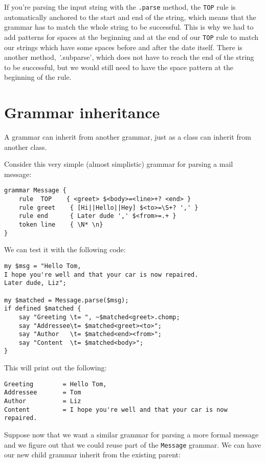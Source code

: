 If you're parsing the input string with the {\tt .parse} method,
the {\tt TOP} rule is automatically anchored to the start and end 
of the string, which means that the grammar has to match 
the whole string to be successful. This is why we had to 
add patterns for spaces at the beginning and at the end of 
our {\tt TOP} rule to match our strings which have some 
spaces before and after the date itself. There is another 
method, \emph'.subparse', which does not have to reach the 
end of the string to be successful, but we would still need to 
have the space pattern at the beginning of the rule.

\section{Grammar inheritance}

A grammar can inherit from another grammar, just as a 
class can inherit from another class.

Consider this very simple (almost simplistic) grammar 
for parsing a mail message:

\begin{verbatim}
grammar Message {
    rule  TOP    { <greet> $<body>=<line>+? <end> }
    rule greet    { [Hi||Hello||Hey] $<to>=\S+? ',' }
    rule end      { Later dude ',' $<from>=.+ }
    token line    { \N* \n}
}
\end{verbatim}

We can test it with the following code:

\begin{verbatim}
my $msg = "Hello Tom,
I hope you're well and that your car is now repaired.
Later dude, Liz";

my $matched = Message.parse($msg);
if defined $matched { 
    say "Greeting \t= ", ~$matched<greet>.chomp;
    say "Addressee\t= $matched<greet><to>";
    say "Author   \t= $matched<end><from>";
    say "Content  \t= $matched<body>";
}
\end{verbatim}

This will print out the following:

\begin{verbatim}
Greeting        = Hello Tom,
Addressee       = Tom
Author          = Liz
Content         = I hope you're well and that your car is now repaired.
\end{verbatim}

Suppose now that we want a similar grammar for parsing 
a more formal message and we figure out that we could 
reuse part of the {\tt Message} grammar. We can have our 
new child grammar inherit from the existing parent:

